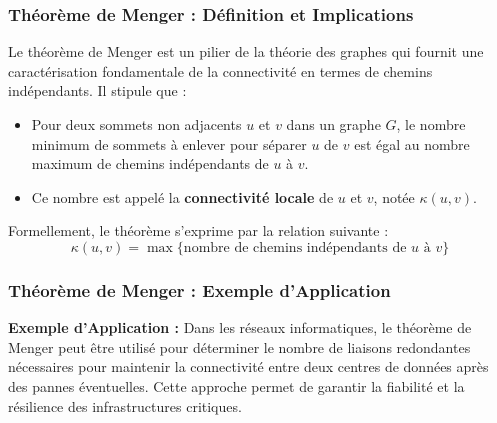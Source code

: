 \begin{frame}
\frametitle{Théorème de Menger : Définition et Implications}
    \begin{tcolorbox}[colback=orange!10,colframe=orange!100!black,
        title=Théorème de Menger]
        Le théorème de Menger est un pilier de la théorie des graphes qui fournit une caractérisation fondamentale de la connectivité en termes de chemins indépendants. Il stipule que :
        \begin{itemize}
            \item Pour deux sommets non adjacents \( u \) et \( v \) dans un graphe \( G \), le nombre minimum de sommets à enlever pour séparer \( u \) de \( v \) est égal au nombre maximum de chemins indépendants de \( u \) à \( v \).
            \item Ce nombre est appelé la \textbf{connectivité locale} de \( u \) et \( v \), notée \( \kappa(u,v) \).
        \end{itemize}
        Formellement, le théorème s'exprime par la relation suivante :
        $$ \kappa(u,v) = \max \{ \text{nombre de chemins indépendants de } u \text{ à } v \} $$
    \end{tcolorbox}
\end{frame}

\begin{frame}
\frametitle{Théorème de Menger : Exemple d'Application}
    \begin{tcolorbox}[colback=orange!10,colframe=orange!100!black,
        title=Application Pratique du Théorème de Menger]
        \textbf{Exemple d'Application :}
        Dans les réseaux informatiques, le théorème de Menger peut être utilisé pour déterminer le nombre de liaisons redondantes nécessaires pour maintenir la connectivité entre deux centres de données après des pannes éventuelles. Cette approche permet de garantir la fiabilité et la résilience des infrastructures critiques.
    \end{tcolorbox}
\end{frame}
